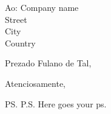 \documentclass{letter}
\begin{document}
\begin{letter}{Ao: Company name \\ Street\\ City\\ Country}
\opening{Prezado Fulano de Tal,}
\lipsum[1-2]
\closing{Atenciosamente,}
\ps{P.S. Here goes your ps.}
\end{letter}
\end{document}
